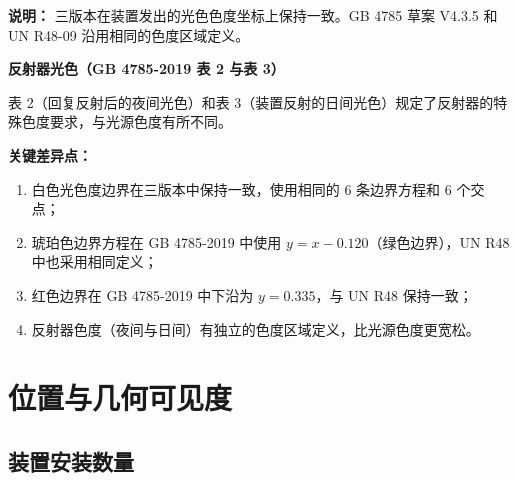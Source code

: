 \textbf{说明：} 三版本在装置发出的光色色度坐标上保持一致。GB 4785 草案 V4.3.5 和 UN R48-09 沿用相同的色度区域定义。

\textbf{反射器光色（GB 4785-2019 表 2 与表 3）}

表 2（回复反射后的夜间光色）和表 3（装置反射的日间光色）规定了反射器的特殊色度要求，与光源色度有所不同。

\textbf{关键差异点：}

\begin{enumerate}[leftmargin=2em]
    \item 白色光色度边界在三版本中保持一致，使用相同的 6 条边界方程和 6 个交点；
    \item 琥珀色边界方程在 GB 4785-2019 中使用 $y = x - 0.120$（绿色边界），UN R48 中也采用相同定义；
    \item 红色边界在 GB 4785-2019 中下沿为 $y = 0.335$，与 UN R48 保持一致；
    \item 反射器色度（夜间与日间）有独立的色度区域定义，比光源色度更宽松。
\end{enumerate}

\section{位置与几何可见度}

\subsection{装置安装数量}

